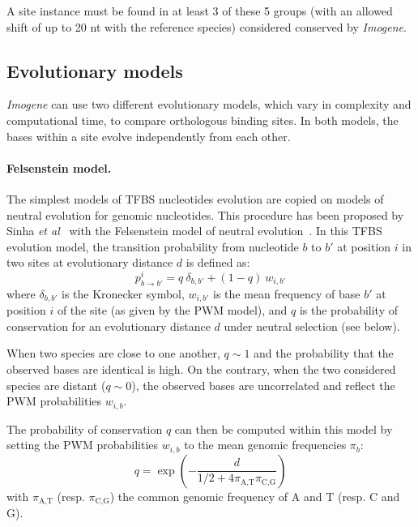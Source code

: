 \documentclass[a4,center,fleqn]{NAR}
\newcommand{\pa}{\pi_\textrm{A,T}}
\newcommand{\pc}{\pi_\textrm{C,G}}
\begin{document}
A site instance must be found in at least 3 of these 5 groups (with an allowed
shift of up to 20 nt with the reference species)
considered conserved by {\em Imogene}.


\subsection*{Evolutionary models}

{\em Imogene} can use two different evolutionary models, which vary in
complexity and computational time, to compare orthologous binding sites.
In both models, the bases within
a site evolve independently from each other. 
\\

\paragraph{Felsenstein model. }

The simplest models of TFBS nucleotides evolution are copied on models of
neutral evolution for genomic nucleotides.
This procedure has been proposed by Sinha \textsl{et al}~\cite{Sinha:2003vn,
siddharthan2005phylogibbs}  with the Felsenstein model of neutral
evolution~\cite{Felsenstein:1981ve}.
In this TFBS evolution model, the transition probability from nucleotide $b$ to
$b'$ at position $i$ in two sites at evolutionary distance $d$ is defined as:
\begin{equation}
    p_{b\rightarrow b'}^i=q\ \delta_{b,b'}+(1-q)\ w_{i,b'}
    \label{felsenstein-integr-TF}
\end{equation}
where $\delta_{b,b'}$ is the Kronecker symbol, $w_{i,b'}$ is the mean frequency
of base $b'$ at position $i$ of the site (as given by the PWM model), and $q$ is
the probability of conservation for an evolutionary distance  $d$ under neutral
selection (see below).

When two species are close to one another, $q\sim1$ and the probability that
the observed bases are identical is high.
On the contrary, when the two considered species are distant ($q\sim0$), the
observed bases are uncorrelated and reflect the PWM probabilities $w_{i,b}$.

The probability of conservation $q$ can then be computed within this model by
setting the PWM probabilities $w_{i,b}$ to the mean genomic frequencies
$\pi_b$:
\begin{equation}
        q=\exp\left(-\frac{d}{1/2+4\pa\pc}\right) \label{q-felsen-TF}
\end{equation}
with $\pa$ (resp. $\pc$) the common genomic frequency of A and T (resp. C and
G).
\end{document}
